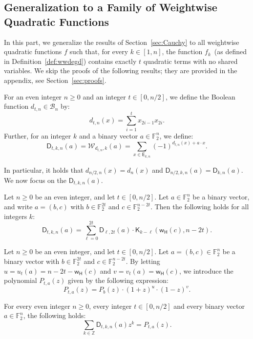 \documentclass[runningheads,orivec]{llncs}
\newcommand{\BN}{\mathcal{B}_n}
\newcommand{\Dkna}[3]{\mathsf{D}_{#2,#1}(a)}
\newcommand{\Dtkna}[4]{\mathsf{D}_{#1,#2,#3}(#4)}
\newcommand{\Ekn}[2]{\mathsf{E}_{#1,#2}}
\newcommand{\F}{\mathbb{F}}
\newcommand{\kraw}[3]{\mathsf{K}_{#1}(#2,#3)}
\newcommand{\w}{\mathsf{w_H}}
\newcommand{\wtk}[2]{\mathcal{W}_{#1,#2}}
\newcommand{\Z}{\mathbb{Z}}
\let\geq=\geqslant
\begin{document}
    \subsection{Generalization to a Family of Weightwise Quadratic Functions}\label{sec:general}
    
    In this part, we generalize the results of Section~\ref{sec:Cauchy} to all weightwise quadratic functions $f$ such that, for every $k \in [1, n]$, the function $f_k$ (as defined in Definition~\ref{def:wwdegd}) contains exactly $t$ quadratic terms with no shared variables. We skip the proofs of the following results; they are provided in the appendix, see Section~\ref{sec:proofs}.
    
    \begin{definition}
    	For an even integer $n\geq 0$ and an integer $t\in[0,n/2]$, we define the Boolean function $d_{t,n}\in\BN$ by:
    	\[
    		d_{t,n}(x)=\sum_{i=1}^t x_{2i-1} x_{2i}.
    	\]
    	Further, for an integer $k$ and a binary vector $a\in\F_2^n$, we define:
    	\[
    		\Dtkna{t}{k}{n}{a}=\wtk{d_{t,n}}{k}(a)=\sum_{x\in \Ekn{k}{n}} (-1)^{d_{t,n}(x) +a\cdot x}.
    	\]
    \end{definition}
    
    In particular, it holds that $d_{n/2,n}(x)=d_n(x)$ and $\Dtkna{n/2}{k}{n}{a}=\Dkna nka$. We now focus on the $\Dtkna{t}{k}{n}{a}$.
    
    \begin{proposition}\label{proposition:dtn}
        Let $n\geq 0$ be an even integer, and let $t\in[0,n/2]$. Let $a\in\F_2^n$ be a binary vector, and write $a=(b,c)$ with $b\in\F_2^{2t}$ and $c\in\F_2^{n-2t}$. Then the following holds for all integers $k$:
    	\[
    		\Dtkna{t}{k}{n}{a}=\sum_{\ell=0}^{2t} \Dkna{2t}{\ell}{b}\cdot\kraw{k-\ell}{\w(c)}{n-2t}.
    	\]
    \end{proposition}
    
    \begin{definition}\label{defi:P_a_t}
        Let $n\geq 0$ be an even integer, and let $t\in[0,n/2]$. Let $a=(b,c)\in\F_2^n$ be a binary vector with $b\in\F_2^{2t}$ and $c\in\F_2^{n-2t}$. By letting $u=u_t(a)=n-2t-\w(c)$ and $v=v_t(a)=\w(c)$, we introduce the polynomial $P_{t,a}(z)$ given by the following expression:
        \[
            P_{t,a}(z)=P_b(z)\cdot(1+z)^u\cdot(1-z)^v.
        \]
    \end{definition}
    
    \begin{proposition}\label{proposition:sum_dtn}
        For every even integer $n\geq 0$, every integer $t\in[0,n/2]$ and every binary vector $a\in\F_2^n$, the following holds:
        \[
            \sum_{k\in\Z}\Dtkna{t}{k}{n}{a}z^k=P_{t,a}(z).
        \]
    \end{proposition}
    
\end{document}
